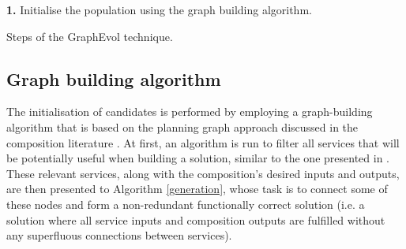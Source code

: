 \documentclass{article}
\begin{document}
\begin{algorithm}
 \setlength{}
 \let\oldnl\nl%
\newcommand{\nonl}{\renewcommand{\nl}{\let\nl\oldnl}}
 \LinesNumbered
	\textbf{1.} Initialise the population using the graph building algorithm.\\
	\nonl {}
 \caption{\footnotesize Steps of the GraphEvol technique.}
\label{graphEvolSteps}
\end{algorithm}

\subsection{Graph building algorithm}

The initialisation of candidates is performed by employing a graph-building algorithm that is based on
the planning graph approach discussed in the composition literature \cite{chen2014qos,deng2013efficient,huang2009effective}.
At first, an algorithm is run to filter all services that will be potentially useful when building a solution, similar
to the one presented in \cite{wang2013genetic}. These relevant services, along with the composition's desired inputs and outputs, are
then presented to Algorithm \ref{generation}, whose task is to connect some of these nodes and form a non-redundant functionally
correct solution (i.e. a solution where all service inputs and composition outputs are fulfilled without any superfluous connections
between services).
\end{document}
